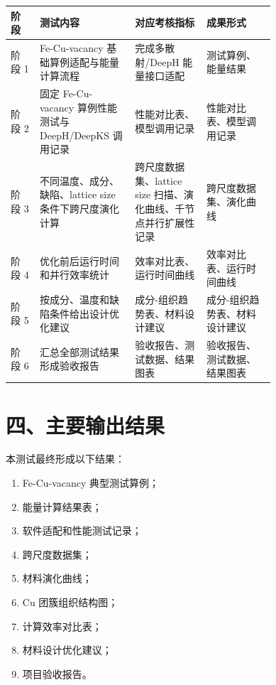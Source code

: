 \documentclass[UTF8,11pt,fontset=none]{ctexart}
\renewcommand{\arraystretch}{1.18}
\begin{document}
\begin{center}
\small
\renewcommand{\arraystretch}{1.30}
\begin{tabularx}{\linewidth}{L{0.11\linewidth}L{0.36\linewidth}L{0.27\linewidth}Y}
\hline
{}
\textbf{阶段} & \textbf{测试内容} & \textbf{对应考核指标} & \textbf{成果形式} \\
\hline
阶段 1 & Fe-Cu-vacancy 基础算例适配与能量计算流程 & 完成多散射/DeepH 能量接口适配 & 测试算例、能量结果 \\
\hline
阶段 2 & 固定 Fe-Cu-vacancy 算例性能测试与 DeepH/DeepKS 调用记录 & 性能对比表、模型调用记录 & 性能对比表、模型调用记录 \\
\hline
阶段 3 & 不同温度、成分、缺陷、lattice size 条件下跨尺度演化计算 & 跨尺度数据集、lattice size 扫描、演化曲线、千节点并行扩展性记录 & 跨尺度数据集、演化曲线 \\
\hline
阶段 4 & 优化前后运行时间和并行效率统计 & 效率对比表、运行时间曲线 & 效率对比表、运行时间曲线 \\
\hline
阶段 5 & 按成分、温度和缺陷条件给出设计优化建议 & 成分-组织趋势表、材料设计建议 & 成分-组织趋势表、材料设计建议 \\
\hline
阶段 6 & 汇总全部测试结果形成验收报告 & 验收报告、测试数据、结果图表 & 验收报告、测试数据、结果图表 \\
\hline
\end{tabularx}
\end{center}

\section*{四、主要输出结果}
本测试最终形成以下结果：
\begin{enumerate}
\item Fe-Cu-vacancy 典型测试算例；
\item 能量计算结果表；
\item 软件适配和性能测试记录；
\item 跨尺度数据集；
\item 材料演化曲线；
\item Cu 团簇组织结构图；
\item 计算效率对比表；
\item 材料设计优化建议；
\item 项目验收报告。
\end{enumerate}
\end{document}
